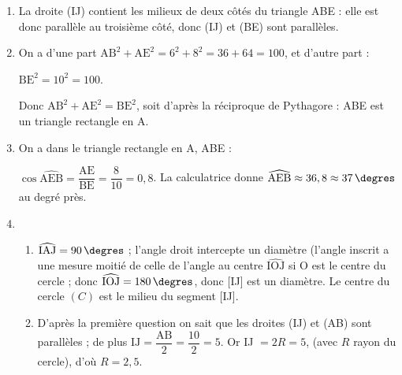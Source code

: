 \begin{enumerate}
\item %
La droite (IJ) contient les milieux de deux côtés du triangle ABE : elle est donc parallèle au troisième côté, donc (IJ) et (BE) sont parallèles.

\item %
On a d'une part $\text{AB}^2 + \text{AE}^2 = 6^2 + 8^2 = 36 + 64 = 100$, et d'autre part :

$\text{BE}^2 = 10^2 = 100$.

Donc $\text{AB}^2 + \text{AE}^2  = \text{BE}^2$, soit d'après la réciproque de Pythagore : ABE est un triangle rectangle en A.
\item %
On a dans le triangle rectangle en A, ABE :

$\cos \widehat{\text{AEB}} = \dfrac{\text{AE}}{\text{BE}} = \dfrac{8}{10} = 0,8$. La calculatrice donne $\widehat{\text{AEB}} \approx 36,8 \approx 37\,\degres$ au degré près.
\item  
	\begin{enumerate}
		\item %
$\widehat{\text{IAJ}} = 90\,\degres$ ; l'angle droit intercepte un diamètre (l'angle inscrit a une mesure moitié de celle de l'angle 	au centre $\widehat{\text{IOJ}}$ si O est le centre du cercle ; donc $\widehat{\text{IOJ}} = 180\,\degres$, donc [IJ] est un diamètre. Le centre du cercle $(C)$ est le milieu du segment [IJ].
		\item %
D'après la première question on sait que les droites (IJ) et (AB) sont parallèles ; de plus $\text{IJ} = \dfrac{\text{AB}}{2} = \dfrac{10}{2} = 5$. Or IJ $ = 2R = 5$, (avec $R$ rayon du cercle),  d'où $R = 2,5$.
	\end{enumerate}
\end{enumerate}

\bigskip

